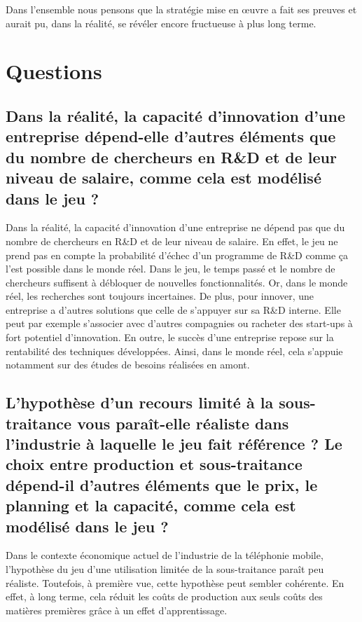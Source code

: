 \documentclass[a4paper,11pt]{article}
\theoremstyle{remark}
\begin{document}
	Dans l'ensemble nous pensons que la stratégie mise en œuvre a fait ses preuves et aurait pu, dans la réalité, se révéler encore fructueuse à plus long terme.

\section{Questions}

	\subsection{Dans la réalité, la capacité d’innovation d’une entreprise dépend-elle d’autres éléments que du nombre de chercheurs en R\&D et de leur niveau de salaire, comme cela est modélisé dans le jeu ?}

		Dans la réalité, la capacité d'innovation d'une entreprise ne dépend pas que du nombre de chercheurs en R\&D et de leur niveau de salaire.
		En effet, le jeu ne prend pas en compte la probabilité d'échec d'un programme de R\&D comme ça l'est possible dans le monde réel.
		Dans le jeu, le temps passé et le nombre de chercheurs suffisent à débloquer de nouvelles fonctionnalités.
		Or, dans le monde réel, les recherches sont toujours incertaines.
		De plus, pour innover, une entreprise a d'autres solutions que celle de s'appuyer sur sa R\&D interne.
		Elle peut par exemple s'associer avec d'autres compagnies ou racheter des start-ups à fort potentiel d'innovation. 
		En outre, le succès d'une entreprise repose sur la rentabilité des techniques développées.
		Ainsi, dans le monde réel, cela s'appuie notamment sur des études de besoins réalisées en amont. 

	\subsection{L’hypothèse d’un recours limité à la sous-traitance vous paraît-elle réaliste dans l’industrie à laquelle le jeu fait référence ?
		Le choix entre production et sous-traitance dépend-il d’autres éléments que le prix, le planning et la capacité, comme cela est modélisé dans le jeu ?}

		Dans le contexte économique actuel de l'industrie de la téléphonie mobile, l'hypothèse du jeu d'une utilisation limitée de la sous-traitance paraît peu réaliste.
		Toutefois, à première vue, cette hypothèse peut sembler cohérente.
		En effet, à long terme, cela réduit les coûts de production aux seuls coûts des matières premières grâce à un effet d'apprentissage.
\end{document}
